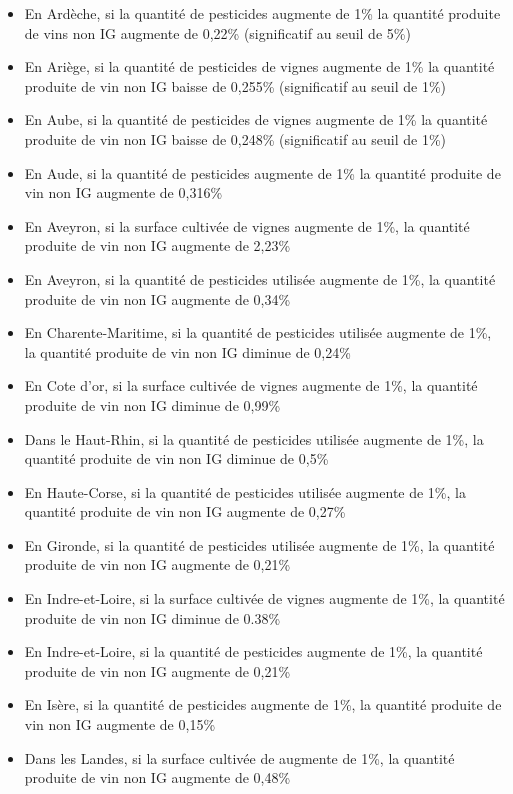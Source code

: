 \documentclass[11pt, a4paper]{article}
\begin{document}
\begin{itemize}
    \item En Ardèche, si la quantité de pesticides  augmente de 1\% la quantité produite de vins non IG augmente de 0,22\% (significatif au seuil de 5\%)
    \item En Ariège, si la quantité de pesticides de vignes augmente de 1\% la quantité produite de vin non IG baisse de 0,255\% (significatif au seuil de 1\%)
    \item En Aube, si la quantité de pesticides de vignes augmente de 1\% la quantité produite de vin non IG baisse de 0,248\% (significatif au seuil de 1\%)
    \item En Aude, si la quantité de pesticides augmente de 1\% la quantité produite de vin non IG augmente de 0,316\%
    \item En Aveyron, si la surface cultivée de vignes augmente de 1\%, la quantité produite de vin non IG augmente de 2,23\%
    \item En Aveyron, si la quantité de pesticides utilisée augmente de 1\%, la quantité produite de vin non IG augmente de 0,34\%
    \item En Charente-Maritime, si la quantité de pesticides utilisée augmente de 1\%, la quantité produite de vin non IG diminue de 0,24\%
    \item En Cote d’or, si la surface cultivée de vignes augmente de 1\%, la quantité produite de vin non IG diminue de 0,99\%
    \item Dans le Haut-Rhin, si la quantité de pesticides utilisée augmente de 1\%, la quantité produite de vin non IG diminue de 0,5\%
    \item En Haute-Corse, si la quantité de pesticides utilisée augmente de 1\%, la quantité produite de vin non IG augmente de 0,27\%
    \item En Gironde, si la quantité de pesticides utilisée augmente de 1\%, la quantité produite de vin non IG augmente de 0,21\%
    \item En Indre-et-Loire, si la surface cultivée de vignes augmente de 1\%, la quantité produite de vin non IG diminue de 0.38\%
    \item En Indre-et-Loire, si la quantité de pesticides augmente de 1\%, la quantité produite de vin non IG augmente de 0,21\%
    \item En Isère, si la quantité de pesticides augmente de 1\%, la quantité produite de vin non IG augmente de 0,15\%
    \item Dans les Landes, si la surface cultivée de augmente de 1\%, la quantité produite de vin non IG augmente de 0,48\%

\end{itemize}
\end{document}
